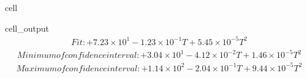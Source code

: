 \documentclass[letterpaper,10pt,english]{jupyterBook}
\begin{document}
\begin{sphinxuseclass}{cell}
\begin{sphinxVerbatimOutput}
\begin{sphinxuseclass}{cell_output}
				\sphinxAtStartPar
				\begin{equation*}
					\begin{split}Fit: \boxed{ + 7.23 \times 10^{1} - 1.23 \times 10^{-1} T + 5.45 \times 10^{-5} T^{2}  }\end{split}
				\end{equation*}
				\begin{equation*}
					\begin{split}Minimum of confidence interval: \boxed{ + 3.04 \times 10^{1} - 4.12 \times 10^{-2} T + 1.46 \times 10^{-5} T^{2}  }\end{split}
				\end{equation*}
				\begin{equation*}
					\begin{split}Maximum of confidence interval: \boxed{ + 1.14 \times 10^{2} - 2.04 \times 10^{-1} T + 9.44 \times 10^{-5} T^{2}  }\end{split}
				\end{equation*}
				\noindent{}
				
		\end{sphinxuseclass}\end{sphinxVerbatimOutput}
		
	\end{sphinxuseclass}
\end{document}
